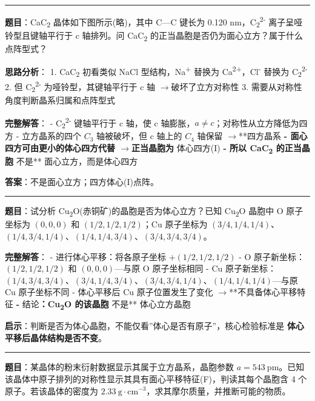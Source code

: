 \documentclass[a4paper,11pt]{ctexart}
\newcommand{\箭}{\ensuremath{\rightarrow}}
\newcommand{\左箭}{\ensuremath{\leftarrow}}
\newcommand{\上箭}{\ensuremath{\uparrow}}
\newcommand{\下箭}{\ensuremath{\downarrow}}
\newcommand{\衡}{\ensuremath{\rightleftharpoons}}
\newcommand{\双箭}{\ensuremath{\leftrightarrow}}
\newcommand{\约等于}{\ensuremath{\approx}}
\newcommand{\小于等于}{\ensuremath{\leq}}
\newcommand{\大于等于}{\ensuremath{\geq}}
\newcommand{\不等于}{\ensuremath{\neq}}
\newcommand{\西格马}{\ensuremath{\sigma}}
\newcommand{\派}{\ensuremath{\pi}}
\begin{document}
\begin{center}\rule{0.5\linewidth}{0.5pt}\end{center}

\textbf{题目}：CaC\textsubscript{2} 晶体如下图所示(略)，其中 C---C 键长为 0.120 nm，C\textsubscript{2}\textsuperscript{2-} 离子呈哑铃型且键轴平行于 c 轴排列。问 CaC\textsubscript{2} 的正当晶胞是否仍为面心立方？属于什么点阵型式？

\textbf{思路分析}：
1. CaC\textsubscript{2} 初看类似 NaCl 型结构，Na\textsuperscript{+} 替换为 Ca\textsuperscript{2+}，Cl\textsuperscript{-} 替换为 C\textsubscript{2}\textsuperscript{2-}
2. 但 C\textsubscript{2}\textsuperscript{2-} 为哑铃型，其键轴平行于 c 轴 \箭 破坏了立方对称性
3. 需要从对称性角度判断晶系归属和点阵型式

\textbf{完整解答}：
- C\textsubscript{2}\textsuperscript{2-} 键轴平行于 c 轴，使 c 轴膨胀，\(a \neq c\)；对称性从立方降低为四方
- 立方晶系的四个 \(C_3\) 轴被破坏，但 c 轴上的 \(C_4\) 轴保留 \箭 **四方晶系\textbf{
- 面心四方可由更小的体心四方代替 \箭 正当晶胞为 }体心四方(I)\textbf{
- 所以 CaC\textsubscript{2} 的正当晶胞 }不是** 面心立方，而是体心四方

\textbf{答案}：不是面心立方；四方体心(I)点阵。

\begin{center}\rule{0.5\linewidth}{0.5pt}\end{center}

\textbf{题目}：试分析 Cu\textsubscript{2}O(赤铜矿)的晶胞是否为体心立方？已知 Cu\textsubscript{2}O 晶胞中 O 原子坐标为 \((0, 0, 0)\) 和 \((1/2, 1/2, 1/2)\)；Cu 原子坐标为 \((3/4, 1/4, 1/4)\)、\((1/4, 3/4, 1/4)\)、\((1/4, 1/4, 3/4)\)、\((3/4, 3/4, 3/4)\)。

\textbf{完整解答}：
- 进行体心平移：将各原子坐标 \(+(1/2, 1/2, 1/2)\)
- O 原子新坐标：\((1/2, 1/2, 1/2)\) 和 \((0, 0, 0)\)---与原 O 原子坐标相同
- Cu 原子新坐标：\((1/4, 3/4, 3/4)\)、\((3/4, 1/4, 3/4)\)、\((3/4, 3/4, 1/4)\)、\((1/4, 1/4, 1/4)\)---与原 Cu 原子坐标不同
- 体心平移后 Cu 原子位置发生了变化 \箭 **不具备体心平移特征\textbf{
- }结论\textbf{：Cu\textsubscript{2}O 的该晶胞 }不是** 体心立方晶胞

\textbf{启示}：判断是否为体心晶胞，不能仅看''体心是否有原子''，核心检验标准是 \textbf{体心平移后晶体结构是否不变}。

\begin{center}\rule{0.5\linewidth}{0.5pt}\end{center}

\textbf{题目}：某晶体的粉末衍射数据显示其属于立方晶系，晶胞参数 \(a = 543\ \mathrm{pm}\)。已知该晶体中原子排列的对称性显示其具有面心平移特征(F)，判读其每个晶胞含 4 个原子。若该晶体的密度为 \(2.33\ \mathrm{g\cdot cm^{-3}}\)，求其摩尔质量，并推断可能的物质。
\end{document}
